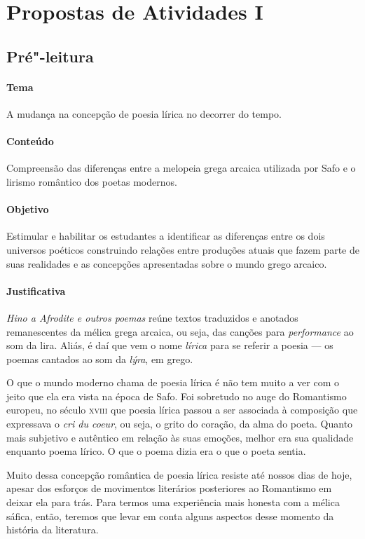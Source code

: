 \documentclass[12pt]{extarticle}
\begin{document}
\section{Propostas de Atividades I}

\subsection{Pré"-leitura}

\paragraph{Tema} A mudança na concepção de poesia lírica no decorrer do tempo.

\paragraph{Conteúdo} Compreensão das diferenças entre a melopeia grega arcaica
utilizada por Safo e o lirismo romântico dos poetas modernos.

\paragraph{Objetivo} Estimular e habilitar os estudantes a identificar as 
diferenças entre os dois universos poéticos construindo relações entre
produções atuais que fazem parte de suas realidades e as concepções 
apresentadas sobre o mundo grego arcaico.

\paragraph{Justificativa} \emph{Hino a Afrodite e outros poemas} reúne textos traduzidos 
e anotados remanescentes da mélica grega arcaica, ou seja, das canções para 
\textit{performance} ao som da lira. Aliás, é daí que vem o nome \emph{lírica} 
para se referir a poesia --- os poemas cantados ao som da \textit{lýra}, em grego.

O que o mundo moderno chama de poesia lírica é não tem muito a ver com
o jeito que ela era vista na época de Safo. Foi sobretudo no auge do
Romantismo europeu, no século \textsc{xviii} que poesia lírica passou a ser
associada à composição que expressava o \textit{cri du coeur}, ou seja,
o grito do coração, da alma do poeta. Quanto mais subjetivo e autêntico
em relação às suas emoções, melhor era sua qualidade enquanto poema
lírico. O que o poema dizia era o que o poeta sentia. 

Muito dessa concepção romântica de poesia lírica resiste até nossos dias
de hoje, apesar dos esforços de movimentos literários posteriores ao Romantismo
em deixar ela para trás. Para termos uma experiência mais honesta com a mélica 
sáfica, então, teremos que levar em conta alguns aspectos desse momento da 
história da literatura.
\end{document}
